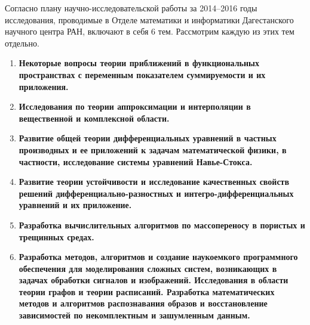 \Introduction

Согласно плану научно-исследовательской работы за 2014--2016 годы исследования, проводимые в Отделе математики и информатики Дагестанского научного центра РАН, включают в себя 6 тем. Рассмотрим каждую из этих тем отдельно.

\begin{enumerate}[1.]
\item
\textbf{Некоторые вопросы теории приближений в функциональных пространствах с переменным показателем суммируемости и их приложения.}





\item
\textbf{Исследования по теории аппроксимации и интерполяции в вещественной и комплексной области.}




\item
\textbf{Развитие общей теории дифференциальных уравнений в частных производных и ее приложений к задачам математической физики, в частности, исследование системы уравнений Навье-Стокса.}




\item
\textbf{Развитие теории устойчивости и исследование качественных свойств решений дифференциально-разностных и интегро-дифференциальных уравнений и их приложение.}




\item
\textbf{Разработка вычислительных алгоритмов по массопереносу в пористых и трещинных средах.}




\item
\textbf{Разработка методов, алгоритмов и создание наукоемкого программного обеспечения для моделирования сложных систем, возникающих в задачах обработки сигналов и изображений. Исследования в области теории графов и теории расписаний.
Разработка математических методов и алгоритмов распознавания образов и восстановление зависимостей по некомплектным и зашумленным данным.}





\end{enumerate}




